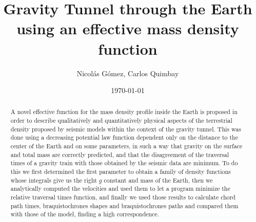 \documentclass[aps,twocolumn,showpacs,preprintnumbers]{revtex4}
\begin{document}
\title{Gravity Tunnel through the Earth using  an effective mass density function}

\author{Nicolás Gómez, Carlos Quimbay}


\date{\today}

\begin{abstract}  



A novel effective function for the mass density profile inside the Earth is proposed in order to describe qualitatively and quantitatively physical aspects of the terrestrial density proposed by seismic models within the context of the gravity tunnel. This was done using a decreasing potential law function dependent only on the distance to the center of the Earth and on some parameters, in such a way that gravity on the surface and total mass are correctly predicted, and that the disagreement of the traversal times of a gravity train with those obtained by the seismic data are minimum.  To do this we first determined the first parameter to obtain a family of density functions whose integrals give us the right $g$ constant and mass of the Earth, then we analytically computed the velocities and used them to let a program minimize the relative traversal times function, and finally we used those results to calculate chord path times, braquistochrones shapes and braquistochrones paths and compared them with those of the model, finding a high correspondence.





\end{abstract}


\maketitle 
\end{document}
